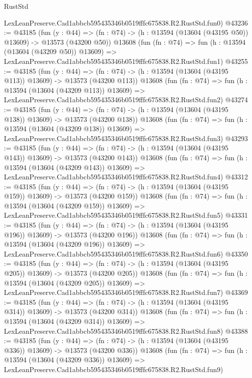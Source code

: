\begin{lexlean}{RustStd}
\begin{coremodule}
    LexLeanPreserve.Cad1abbcb595435346b0519fffc675838.R2.RustStd.fun0)
@43236 := @43185
    (fun (y : @44) =>
    (fn : @74) -> (h : @13594 (@13604 (@43195 @50)) @13609) -> @13573 (@43200 @50))
    @13608
    (fun (fn : @74) =>
    fun (h : @13594 (@13604 (@43209 @50)) @13609) =>
    LexLeanPreserve.Cad1abbcb595435346b0519fffc675838.R2.RustStd.fun1)
@43255 := @43185
    (fun (y : @44) =>
    (fn : @74) -> (h : @13594 (@13604 (@43195 @113)) @13609) -> @13573 (@43200 @113))
    @13608
    (fun (fn : @74) =>
    fun (h : @13594 (@13604 (@43209 @113)) @13609) =>
    LexLeanPreserve.Cad1abbcb595435346b0519fffc675838.R2.RustStd.fun2)
@43274 := @43185
    (fun (y : @44) =>
    (fn : @74) -> (h : @13594 (@13604 (@43195 @138)) @13609) -> @13573 (@43200 @138))
    @13608
    (fun (fn : @74) =>
    fun (h : @13594 (@13604 (@43209 @138)) @13609) =>
    LexLeanPreserve.Cad1abbcb595435346b0519fffc675838.R2.RustStd.fun3)
@43293 := @43185
    (fun (y : @44) =>
    (fn : @74) -> (h : @13594 (@13604 (@43195 @143)) @13609) -> @13573 (@43200 @143))
    @13608
    (fun (fn : @74) =>
    fun (h : @13594 (@13604 (@43209 @143)) @13609) =>
    LexLeanPreserve.Cad1abbcb595435346b0519fffc675838.R2.RustStd.fun4)
@43312 := @43185
    (fun (y : @44) =>
    (fn : @74) -> (h : @13594 (@13604 (@43195 @159)) @13609) -> @13573 (@43200 @159))
    @13608
    (fun (fn : @74) =>
    fun (h : @13594 (@13604 (@43209 @159)) @13609) =>
    LexLeanPreserve.Cad1abbcb595435346b0519fffc675838.R2.RustStd.fun5)
@43331 := @43185
    (fun (y : @44) =>
    (fn : @74) -> (h : @13594 (@13604 (@43195 @196)) @13609) -> @13573 (@43200 @196))
    @13608
    (fun (fn : @74) =>
    fun (h : @13594 (@13604 (@43209 @196)) @13609) =>
    LexLeanPreserve.Cad1abbcb595435346b0519fffc675838.R2.RustStd.fun6)
@43350 := @43185
    (fun (y : @44) =>
    (fn : @74) -> (h : @13594 (@13604 (@43195 @205)) @13609) -> @13573 (@43200 @205))
    @13608
    (fun (fn : @74) =>
    fun (h : @13594 (@13604 (@43209 @205)) @13609) =>
    LexLeanPreserve.Cad1abbcb595435346b0519fffc675838.R2.RustStd.fun7)
@43369 := @43185
    (fun (y : @44) =>
    (fn : @74) -> (h : @13594 (@13604 (@43195 @314)) @13609) -> @13573 (@43200 @314))
    @13608
    (fun (fn : @74) =>
    fun (h : @13594 (@13604 (@43209 @314)) @13609) =>
    LexLeanPreserve.Cad1abbcb595435346b0519fffc675838.R2.RustStd.fun8)
@43388 := @43185
    (fun (y : @44) =>
    (fn : @74) -> (h : @13594 (@13604 (@43195 @336)) @13609) -> @13573 (@43200 @336))
    @13608
    (fun (fn : @74) =>
    fun (h : @13594 (@13604 (@43209 @336)) @13609) =>
    LexLeanPreserve.Cad1abbcb595435346b0519fffc675838.R2.RustStd.fun9)

\end{coremodule}
\end{lexlean}

